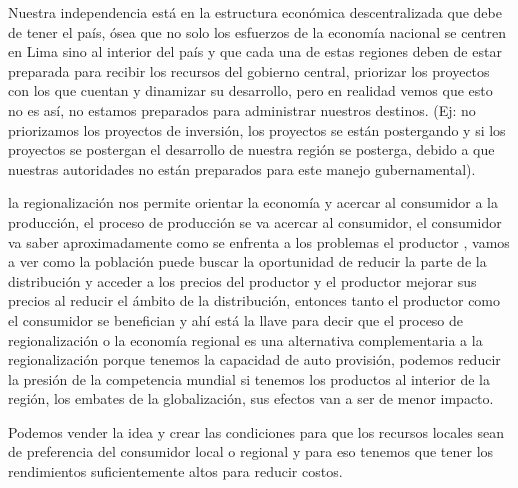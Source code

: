 \documentclass[
  a4paper,
]{article}
\begin{document}
Nuestra independencia está en la estructura económica descentralizada
que debe de tener el país, ósea que no solo los esfuerzos de la economía
nacional se centren en Lima sino al interior del país y que cada una de
estas regiones deben de estar preparada para recibir los recursos del
gobierno central, priorizar los proyectos con los que cuentan y
dinamizar su desarrollo, pero en realidad vemos que esto no es así, no
estamos preparados para administrar nuestros destinos. (Ej: no
priorizamos los proyectos de inversión, los proyectos se están
postergando y si los proyectos se postergan el desarrollo de nuestra
región se posterga, debido a que nuestras autoridades no están
preparados para este manejo gubernamental).

la regionalización nos permite orientar la economía y acercar al
consumidor a la producción, el proceso de producción se va acercar al
consumidor, el consumidor va saber aproximadamente como se enfrenta a
los problemas el productor , vamos a ver como la población puede buscar
la oportunidad de reducir la parte de la distribución y acceder a los
precios del productor y el productor mejorar sus precios al reducir el
ámbito de la distribución, entonces tanto el productor como el
consumidor se benefician y ahí está la llave para decir que el proceso
de regionalización o la economía regional es una alternativa
complementaria a la regionalización porque tenemos la capacidad de auto
provisión, podemos reducir la presión de la competencia mundial si
tenemos los productos al interior de la región, los embates de la
globalización, sus efectos van a ser de menor impacto.

Podemos vender la idea y crear las condiciones para que los recursos
locales sean de preferencia del consumidor local o regional y para eso
tenemos que tener los rendimientos suficientemente altos para reducir
costos.
\end{document}
